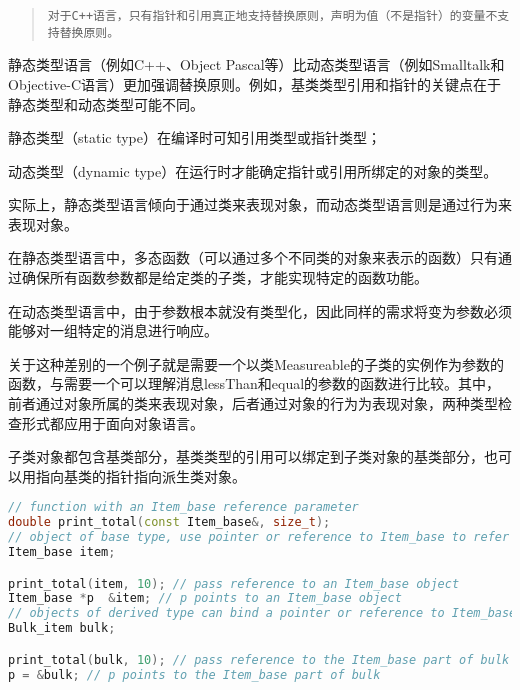 \begin{quote}
\texttt{对于C++语言，只有指针和引用真正地支持替换原则，声明为值（不是指针）的变量不支持替换原则。}
\end{quote}

静态类型语言（例如C++、Object Pascal等）比动态类型语言（例如Smalltalk和Objective-C语言）更加强调替换原则。例如，基类类型引用和指针的关键点在于静态类型和动态类型可能不同。

\begin{compactitem}
\item 静态类型（static type）在编译时可知引用类型或指针类型；
\item 动态类型（dynamic type）在运行时才能确定指针或引用所绑定的对象的类型。
\end{compactitem}

实际上，静态类型语言倾向于通过类来表现对象，而动态类型语言则是通过行为来表现对象。


\begin{compactitem}
\item 在静态类型语言中，多态函数（可以通过多个不同类的对象来表示的函数）只有通过确保所有函数参数都是给定类的子类，才能实现特定的函数功能。
\item 在动态类型语言中，由于参数根本就没有类型化，因此同样的需求将变为参数必须能够对一组特定的消息进行响应。
\end{compactitem}



关于这种差别的一个例子就是需要一个以类Measureable的子类的实例作为参数的函数，与需要一个可以理解消息lessThan和equal的参数的函数进行比较。其中，前者通过对象所属的类来表现对象，后者通过对象的行为为表现对象，两种类型检查形式都应用于面向对象语言。

子类对象都包含基类部分，基类类型的引用可以绑定到子类对象的基类部分，也可以用指向基类的指针指向派生类对象。

\begin{lstlisting}[language=C++]
// function with an Item_base reference parameter
double print_total(const Item_base&, size_t);
// object of base type, use pointer or reference to Item_base to refer to an Item_base object
Item_base item; 

print_total(item, 10); // pass reference to an Item_base object
Item_base *p  &item; // p points to an Item_base object
// objects of derived type can bind a pointer or reference to Item_base to a Bulk_item object
Bulk_item bulk; 

print_total(bulk, 10); // pass reference to the Item_base part of bulk
p = &bulk; // p points to the Item_base part of bulk
\end{lstlisting}



